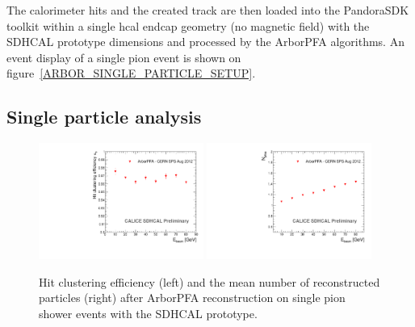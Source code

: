 \documentclass[12pt]{article}
\begin{document}
The calorimeter hits and the created track are then loaded into the PandoraSDK toolkit \cite{pandora-sdk} within a single hcal endcap geometry (no magnetic field) with the SDHCAL prototype dimensions and processed by the ArborPFA algorithms. An event display of a single pion event is shown on figure~\ref{ARBOR_SINGLE_PARTICLE_SETUP}.

\subsection{Single particle analysis}

\begin{figure}[!h]
  \begin{center}
    \includegraphics[width=0.48\textwidth]{plots/SingleParticle_Efficiency.pdf}
    \includegraphics[width=0.48\textwidth]{plots/SingleParticle_NPfos.pdf} \\
  \end{center}
  \caption{\label{ARBOR_SINGLE_PARTICLE_EFFICIENCY_AND_NPFOS} Hit clustering efficiency (left) and the mean number of reconstructed particles (right) after ArborPFA reconstruction on single pion shower events with the SDHCAL prototype.}
\end{figure}
\end{document}
